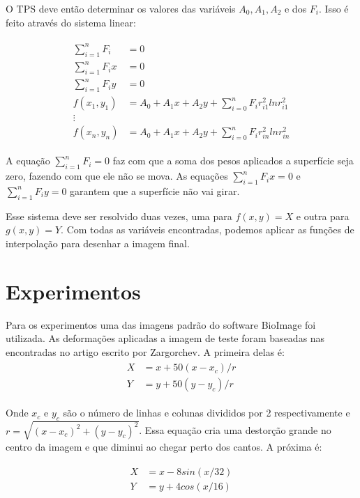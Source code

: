 \documentclass[]{spie}  %
\begin{document}
	O TPS deve então determinar os valores das variáveis $A_0, A_1, A_2$ e dos $F_i$. 
Isso é feito através do sistema linear:

\begin{align}
\begin{split}
	\sum_{i=1}^n F_i &= 0 \\
	\sum_{i=1}^n F_ix &= 0 \\
	\sum_{i=1}^n F_iy &= 0 \\
	f(x_1,y_1) &= A_0 + A_1x + A_2y + \sum_{i=0}^n F_i r_{i1}^2 ln r_{i1}^2 \\
	\vdots \\
	f(x_n,y_n) &= A_0 + A_1x + A_2y + \sum_{i=0}^n F_i r_{in}^2 ln r_{in}^2
\end{split}
\end{align}

A equação $\sum_{i=1}^n F_i = 0$ faz com que a soma dos pesos aplicados a superfície seja zero, fazendo com que
ele não se mova. As equações $\sum_{i=1}^n F_ix = 0$ e $\sum_{i=1}^n F_iy = 0$ garantem que a superfície não vai girar.

	Esse sistema deve ser resolvido duas vezes, uma para $f(x,y) = X$ e outra para $g(x,y) = Y$. Com todas as variáveis
encontradas, podemos aplicar as funções de interpolação para desenhar a imagem final.

\section{Experimentos}
	Para os experimentos uma das imagens padrão do software BioImage\cite{papademetris2005bioimage} foi utilizada.
As deformações aplicadas a imagem de teste foram baseadas nas encontradas no artigo escrito por Zargorchev\cite{zagorchev2006comparative}. A primeira delas é:
\begin{align}
\begin{split}
	X &= x + 50(x-x_c)/r \\
	Y &= y + 50(y-y_c)/r 
\end{split} 
\end{align}

Onde $x_c$ e $y_c$ são o número de linhas e colunas divididos por 2 respectivamente e $r = \sqrt{(x-x_c)^2 + (y-y_c)^2}$.
Essa equação cria uma destorção grande no centro da imagem e que diminui ao chegar perto dos cantos. A próxima é:

\begin{align}
\begin{split}
	X &= x - 8sin(x/32) \\
	Y &= y + 4cos(x/16)
\end{split}  	
\end{align}
\end{document}
